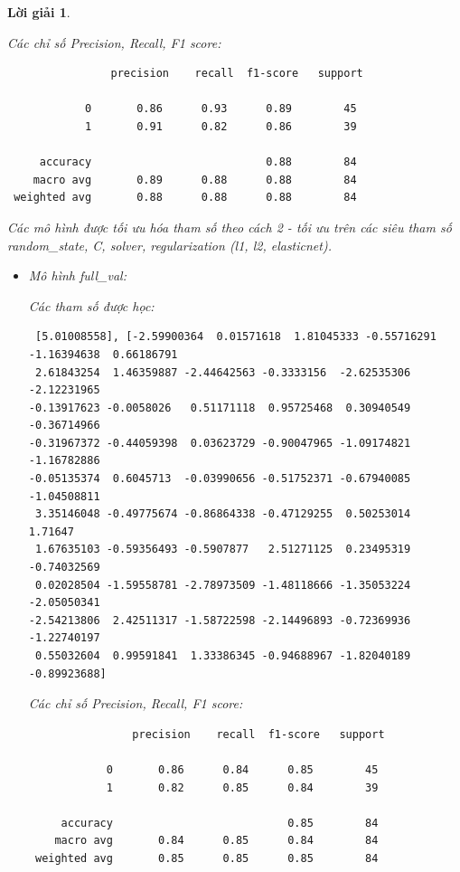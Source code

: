 \documentclass[14pt, a4paper]{article}
\theoremstyle{sltheorem}
\theoremstyle{soltheorem}
\newtheorem*{loigiai}{Lời giải}
\begin{document}
\begin{loigiai}
\begin{itemize}
        Các chỉ số Precision, Recall, F1 score:
        \begin{verbatim}
                precision    recall  f1-score   support

            0       0.86      0.93      0.89        45
            1       0.91      0.82      0.86        39
 
     accuracy                           0.88        84
    macro avg       0.89      0.88      0.88        84
 weighted avg       0.88      0.88      0.88        84
        \end{verbatim}

    \end{itemize}

    
    Các mô hình được tối ưu hóa tham số theo cách 2 - tối ưu trên các siêu tham số random\_state, C, solver, regularization (l1, l2, elasticnet).
    
    \begin{itemize}
        \item Mô hình full\_val:
        
        Các tham số được học:

        \begin{verbatim}
 [5.01008558], [-2.59900364  0.01571618  1.81045333 -0.55716291 -1.16394638  0.66186791
 2.61843254  1.46359887 -2.44642563 -0.3333156  -2.62535306 -2.12231965
-0.13917623 -0.0058026   0.51171118  0.95725468  0.30940549 -0.36714966
-0.31967372 -0.44059398  0.03623729 -0.90047965 -1.09174821 -1.16782886
-0.05135374  0.6045713  -0.03990656 -0.51752371 -0.67940085 -1.04508811
 3.35146048 -0.49775674 -0.86864338 -0.47129255  0.50253014  1.71647
 1.67635103 -0.59356493 -0.5907877   2.51271125  0.23495319 -0.74032569
 0.02028504 -1.59558781 -2.78973509 -1.48118666 -1.35053224 -2.05050341
-2.54213806  2.42511317 -1.58722598 -2.14496893 -0.72369936 -1.22740197
 0.55032604  0.99591841  1.33386345 -0.94688967 -1.82040189 -0.89923688]
        \end{verbatim}

        Các chỉ số Precision, Recall, F1 score:

        \begin{verbatim}
                precision    recall  f1-score   support

            0       0.86      0.84      0.85        45
            1       0.82      0.85      0.84        39
 
     accuracy                           0.85        84
    macro avg       0.84      0.85      0.84        84
 weighted avg       0.85      0.85      0.85        84
        \end{verbatim}


\end{itemize}
\end{loigiai}
\end{document}
